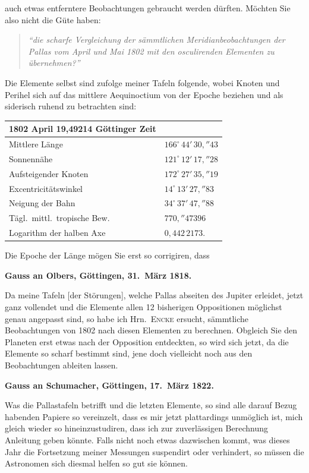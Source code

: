 \documentclass[12pt,a4paper]{article}
\begin{document}
\newpage
\setcounter{page}{441}
%
auch etwas entferntere Beobachtungen gebraucht werden dürften. Möchten Sie also nicht die Güte haben:

\begin{quote}
\textit{``die scharfe Vergleichung der sämmtlichen Meridianbeobachtungen der Pallas vom April und Mai 1802 mit den osculirenden Elementen zu übernehmen?''}
\end{quote}

Die Elemente selbst sind zufolge meiner Tafeln folgende, wobei Knoten und Perihel sich auf das mittlere Aequinoctium von der Epoche beziehen und als siderisch ruhend zu betrachten sind:

\begin{center}
\begin{tabular}{l@{\quad}l}
\toprule
1802 April 19,49214 Göttinger Zeit & \\
\midrule
Mittlere Länge & $166^\circ\,44'\,30{,}''43$ \\
Sonnennähe & $121^\circ\,12'\,17{,}''28$ \\
Aufsteigender Knoten & $172^\circ\,27'\,35{,}''19$ \\
Excentricitätswinkel & $14^\circ\,13'\,27{,}''83$ \\
Neigung der Bahn & $34^\circ\,37'\,47{,}''88$ \\
Tägl.~mittl.~tropische Bew. & $770{,}''47396$ \\
Logarithm der halben Axe & $0{,}442\,2173$. \\
\bottomrule
\end{tabular}
\end{center}

Die Epoche der Länge mögen Sie erst so corrigiren, dass

\medskip\noindent
\textbf{Gauss an Olbers, Göttingen, 31.~März 1818.}

Da meine Tafeln [der Störungen], welche Pallas abseiten des Jupiter erleidet, jetzt ganz vollendet und die Elemente allen 12 bisherigen Oppositionen möglichst genau angepasst sind, so habe ich Hrn.~\textsc{Encke} ersucht, sämmtliche Beobachtungen von 1802 nach diesen Elementen zu berechnen. Obgleich Sie den Planeten erst etwas nach der Opposition entdeckten, so wird sich jetzt, da die Elemente so scharf bestimmt sind, jene doch vielleicht noch aus den Beobachtungen ableiten lassen.

\medskip\noindent
\textbf{Gauss an Schumacher, Göttingen, 17.~März 1822.}

Was die Pallastafeln betrifft und die letzten Elemente, so sind alle darauf Bezug habenden Papiere so vereinzelt, dass es mir jetzt plattardings unmöglich ist, mich gleich wieder so hineinzustudiren, dass ich zur zuverlässigen Berechnung Anleitung geben könnte. Falls nicht noch etwas dazwischen kommt, was dieses Jahr die Fortsetzung meiner Messungen suspendirt oder verhindert, so müssen die Astronomen sich diesmal helfen so gut sie können.
\end{document}

